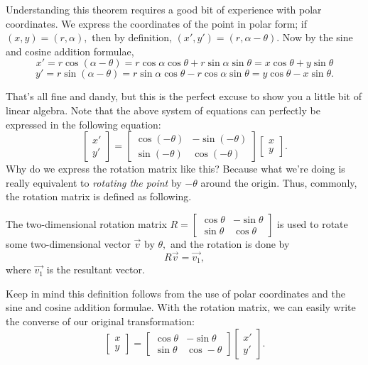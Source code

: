 \documentclass[mast]{lucky}
\begin{document}
Understanding this theorem requires a good bit of experience with polar coordinates. We express the coordinates of the point in polar form; if $(x,y)=(r,\alpha),$ then by definition, $(x',y')=(r,\alpha-\theta).$ Now by the sine and cosine addition formulae,
\[x'=r\cos(\alpha-\theta)=r\cos\alpha\cos\theta+r\sin\alpha\sin\theta=x\cos\theta+y\sin\theta\]
\[y'=r\sin(\alpha-\theta)=r\sin\alpha\cos\theta-r\cos\alpha\sin\theta=y\cos\theta-x\sin\theta.\]

That's all fine and dandy, but this is the perfect excuse to show you a little bit of linear algebra. Note that the above system of equations can perfectly be expressed in the following equation:
\[\begin{bmatrix}x' \\ y'\end{bmatrix}=\begin{bmatrix}\cos (-\theta) & -\sin(-\theta) \\ \sin(-\theta) & \cos(-\theta)\end{bmatrix}\begin{bmatrix}x \\ y\end{bmatrix}.\]
Why do we express the rotation matrix like this? Because what we're doing is really equivalent to \emph{rotating the point} by $-\theta$ around the origin. Thus, commonly, the rotation matrix is defined as following.

\begin{defi}
The two-dimensional rotation matrix $R=\begin{bmatrix}\cos\theta & -\sin\theta \\ \sin\theta & \cos\theta\end{bmatrix}$ is used to rotate some two-dimensional vector $\vec{v}$ by $\theta,$ and the rotation is done by
\[R\vec{v}=\vec{v_1},\]
where $\vec{v_1}$ is the resultant vector.
\end{defi}

Keep in mind this definition follows from the use of polar coordinates and the sine and cosine addition formulae. With the rotation matrix, we can easily write the converse of our original transformation:
\[\begin{bmatrix}x \\ y\end{bmatrix}=\begin{bmatrix}\cos \theta & -\sin\theta \\ \sin\theta & \cos-\theta\end{bmatrix}\begin{bmatrix}x' \\ y'\end{bmatrix}.\]
\end{document}
